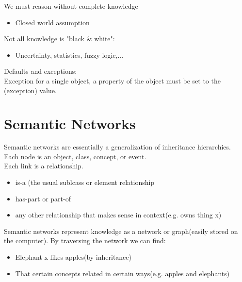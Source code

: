 We must reason without complete knowledge
\begin{itemize}
\item Closed world assumption
\end{itemize}

Not all knowledge is "black \& white":
\begin{itemize}
\item Uncertainty, statistics, fuzzy logic,...
\end{itemize}

Defaults and exceptions:\\
Exception for a single object, a property of the object must be set to the (exception) value.\\

\section{Semantic Networks}
Semantic networks are essentially a generalization of inheritance hierarchies.\\
Each node is an object, class, concept, or event. \\

Each link is a relationship.
\begin{itemize}
\item is-a (the usual sublcass or element relationship
\item has-part or part-of
\item any other relationship that makes sense in context(e.g. owns thing x)
\end{itemize}

Semantic networks represent knowledge as a network or graph(easily stored on the computer). 
By traversing the network we can find:
\begin{itemize}
\item Elephant x likes apples(by inheritance)
\item That certain concepts related in certain ways(e.g. apples and elephants)
\end{itemize}








